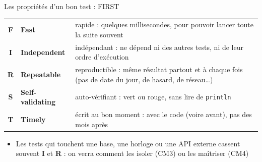 \documentclass[aspectratio=169,10pt]{beamer}
\begin{document}
\begin{frame}{Les propriétés d'un bon test : FIRST}
  \begin{datacard}
    \begin{tabular}{@{}cl p{8.2cm}@{}}
      \textbf{\color{qaaccent}\Large F} & \textbf{Fast} & rapide : quelques millisecondes, pour pouvoir lancer toute la suite souvent \\[1mm]
      \textbf{\color{qaaccent}\Large I} & \textbf{Independent} & indépendant : ne dépend ni des autres tests, ni de leur ordre d'exécution \\[1mm]
      \textbf{\color{qaaccent}\Large R} & \textbf{Repeatable} & reproductible : même résultat partout et à chaque fois (pas de date du jour, de hasard, de réseau\ldots) \\[1mm]
      \textbf{\color{qaaccent}\Large S} & \textbf{Self-validating} & auto-vérifiant : vert ou rouge, sans lire de \texttt{println} \\[1mm]
      \textbf{\color{qaaccent}\Large T} & \textbf{Timely} & écrit au bon moment : avec le code (voire avant), pas des mois après \\
    \end{tabular}
  \end{datacard}
  \vspace{1mm}
  \begin{itemize}\small
    \item Les tests qui touchent une base, une horloge ou une API externe cassent souvent \textbf{I} et \textbf{R} : on verra comment les isoler (CM3) ou les maîtriser (CM4)
  \end{itemize}
\end{frame}
\end{document}
